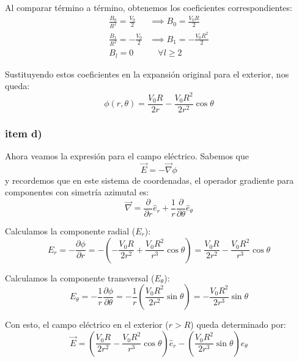 \documentclass[a4paper]{article}
\begin{document}
Al comparar término a término, obtenemos los coeficientes correspondientes:
\begin{align}
\frac{B_0}{R^1} = \frac{V_0}{2} &\implies B_0 = \frac{V_0 R}{2} \\
\frac{B_1}{R^2} = -\frac{V_0}{2} &\implies B_1 = -\frac{V_0 R^2}{2} \\
B_l = 0 &\quad \forall l \ge 2
\end{align}

Sustituyendo estos coeficientes en la expansión original para el exterior, nos queda:
\begin{equation}
\phi(r,\theta) = \frac{V_{0}R}{2r} - \frac{V_{0}R^{2}}{2r^{2}}\cos\theta
\end{equation}

\subsubsection*{item d)}

Ahora veamos la expresión para el campo eléctrico. Sabemos que
\begin{equation}
\vec{E} = -\vec{\nabla}\phi
\end{equation}
y recordemos que en este sistema de coordenadas, el operador gradiente para componentes con simetría azimutal es:
\begin{equation}
\vec{\nabla} = \frac{\partial}{\partial r}\hat{e}_{r} + \frac{1}{r}\frac{\partial}{\partial\theta}\hat{e}_{\theta}
\end{equation}

Calculamos la componente radial ($E_r$):
\begin{equation}
E_r = -\frac{\partial \phi}{\partial r} = -\left( -\frac{V_0 R}{2r^2} + \frac{V_0 R^2}{r^3}\cos\theta \right) = \frac{V_0 R}{2r^2} - \frac{V_0 R^2}{r^3}\cos\theta
\end{equation}

Calculamos la componente transversal ($E_\theta$):
\begin{equation}
E_\theta = -\frac{1}{r}\frac{\partial \phi}{\partial \theta} = -\frac{1}{r}\left( \frac{V_0 R^2}{2r^2}\sin\theta \right) = -\frac{V_0 R^2}{2r^3}\sin\theta
\end{equation}

Con esto, el campo eléctrico en el exterior ($r > R$) queda determinado por:
\begin{equation}
\vec{E} = \left( \frac{V_0 R}{2r^2} - \frac{V_0 R^2}{r^3}\cos\theta \right)\hat{e}_{r} - \left( \frac{V_0 R^2}{2r^3}\sin\theta \right)\hat{e}_{\theta}
\end{equation}

 
\end{document}
